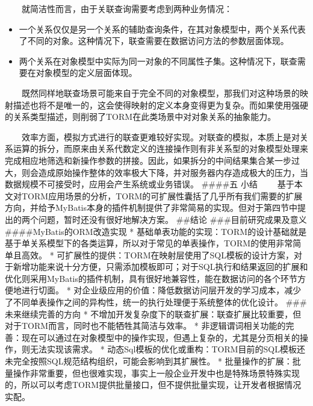\documentclass[]{article}
\begin{document}
　　就简洁性而言，由于关联查询需要考虑到两种业务情况：

\begin{itemize}
\itemsep1pt\parskip0pt
\item
  一个关系仅仅是另一个关系的辅助查询条件，在其对象模型中，两个关系代表了不同的对象。这种情况下，联查需要在数据访问方法的参数层面体现。
\item
  两个关系在对象模型中实际为同一对象的不同属性子集。这种情况下，联查需要在对象模型的定义层面体现。
\end{itemize}

　　既然同样地联查场景可能来自于完全不同的对象模型，那我们对这种场景的映射描述也将不是唯一的，这会使得映射的定义本身变得更为复杂。而如果使用强硬的关系类型描述，则削弱了TORM在此类场景中对对象关系的抽象能力。

　　效率方面，模拟方式进行的联查更难较好实现。对联查的模拟，本质上是对关系运算的拆分，而原来由关系代数定义的连接操作则有非关系型的对象模型处理来完成相应地筛选和新操作参数的拼接。因此，如果拆分的中间结果集合某一步过大，则会造成原始操作整体的效率极大下降，并对服务器内存造成极大的压力，当数据规模不可接受时，应用会产生系统或业务错误。
\#\#\#\#五 小结
　　基于本文对TORM应用场景的分析，TORM的可扩展性囊括了几乎所有我们需要的扩展方向，并给予MyBatis本身的插件机制提供了非常简易的实现。但对于第四节中提出的两个问题，暂时还没有很好地解决方案。
\#\#结论 \#\#\#目前研究成果及意义 \#\#\#\#MyBatis的ORM改造实现 *
基础单表功能的实现：TORM的设计基础就是基于单关系模型下的各类运算，所以对于常见的单表操作，TORM的使用非常简单且高效。
*
可扩展性的提供：TORM在映射层使用了SQL模板的设计方案，对于新增功能来说十分方便，只需添加模板即可；对于SQL执行和结果返回的扩展和优化则采用MyBatis的插件机制，具有很好地兼容性，能在数据访问的各个环节方便地进行切面。
*
对企业级应用的价值：降低数据访问层开发的学习成本，减少了不同单表操作之间的异构性，统一的执行处理便于系统整体的优化设计。
\#\#\#未来继续完善的方向 *
不增加开发复杂度下的联查扩展：联查扩展比较重要，但对于TORM而言，同时也不能牺牲其简洁与效率。
*
非逻辑谓词相关功能的完善：现在可以通过在对象模型中的操作实现，但遇上复杂的，尤其是分页相关的操作，则无法实现该需求。
*
动态Sql模板的优化或重构：TORM目前的SQL模板还未完全按照SQL规范结构组织，可能会影响到其扩展性。
*
批量操作的扩展：批量操作非常重要，但也很难实现，事实上一般企业开发中也是特殊场景特殊实现的，所以可以考虑TORM提供批量接口，但不提供批量实现，让开发者根据情况实配。
\end{document}
